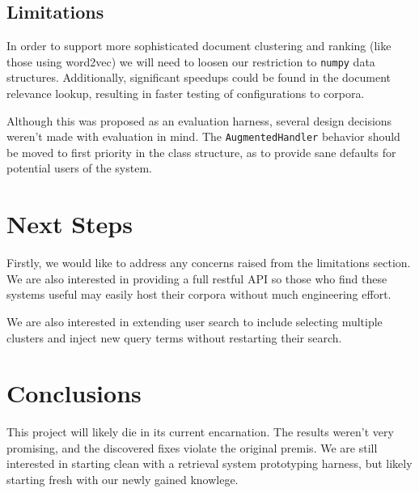 \documentclass[11pt]{article}
\def\np{\texttt{numpy}\xspace}
\begin{document}
\subsection{Limitations}
In order to support more sophisticated document clustering and ranking (like those using
word2vec) we will need to loosen our restriction to \np data structures. Additionally,
significant speedups could be found in the document relevance lookup, resulting in faster
testing of configurations to corpora.

Although this was proposed as an evaluation harness, several design decisions weren't made
with evaluation in mind. The \texttt{AugmentedHandler} behavior should be moved to first
priority in the class structure, as to provide sane defaults for potential users of the
system.

\section{Next Steps}
Firstly, we would like to address any concerns raised from the limitations section. We
are also interested in providing a full restful API so those who find these systems useful
may easily host their corpora without much engineering effort.

We are also interested in extending user search to include selecting multiple clusters and
inject new query terms without restarting their search.

\section{Conclusions}
This project will likely die in its current encarnation. The results weren't very promising,
and the discovered fixes violate the original premis. We are still interested in starting
clean with a retrieval system prototyping harness, but likely starting fresh with our newly
gained knowlege.
\end{document}
